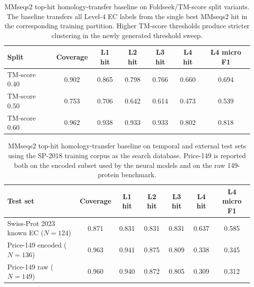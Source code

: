 \documentclass[11pt,a4paper]{article}
\begin{document}
\begin{table}[htbp]
\centering
\caption{MMseqs2 top-hit homology-transfer baseline on Foldseek/TM-score split
variants. The baseline transfers all Level-4 EC labels from the single best
MMseqs2 hit in the corresponding training partition. Higher TM-score thresholds
produce stricter clustering in the newly generated threshold sweep.}
\label{tab:mmseqs_homology_foldseek}
\small
\setlength{\tabcolsep}{4pt}
\begin{tabular}{lcccccc}
\toprule
Split & Coverage & L1 hit & L2 hit & L3 hit & L4 hit & L4 micro F1 \\
\midrule
TM-score 0.40 & 0.902 & 0.865 & 0.798 & 0.766 & 0.660 & 0.694 \\
TM-score 0.50 & 0.753 & 0.706 & 0.642 & 0.614 & 0.473 & 0.539 \\
TM-score 0.60 & 0.962 & 0.938 & 0.933 & 0.933 & 0.802 & 0.818 \\
\bottomrule
\end{tabular}
\end{table}

\begin{table}[htbp]
\centering
\caption{MMseqs2 top-hit homology-transfer baseline on temporal and external
test sets using the SP-2018 training corpus as the search database. Price-149 is
reported both on the encoded subset used by the neural models and on the raw
149-protein benchmark.}
\label{tab:mmseqs_external}
\small
\setlength{\tabcolsep}{4pt}
\begin{tabular}{lcccccc}
\toprule
Test set & Coverage & L1 hit & L2 hit & L3 hit & L4 hit & L4 micro F1 \\
\midrule
Swiss-Prot 2023 known EC ($N=124$) & 0.871 & 0.831 & 0.831 & 0.831 & 0.637 & 0.585 \\
Price-149 encoded ($N=136$) & 0.963 & 0.941 & 0.875 & 0.809 & 0.338 & 0.345 \\
Price-149 raw ($N=149$) & 0.960 & 0.940 & 0.872 & 0.805 & 0.309 & 0.312 \\
\bottomrule
\end{tabular}
\end{table}
\end{document}
